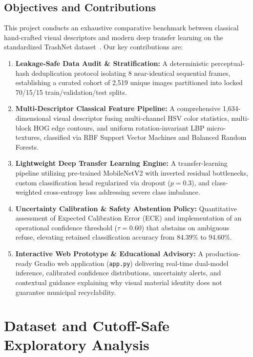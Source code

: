 \documentclass[11pt,a4paper]{article}
\begin{document}
\subsection{Objectives and Contributions}
This project conducts an exhaustive comparative benchmark between classical hand-crafted visual descriptors and modern deep transfer learning on the standardized TrashNet dataset~\cite{thung2016trashnet}. Our key contributions are:
\begin{enumerate}[label=\arabic*.]
    \item \textbf{Leakage-Safe Data Audit \& Stratification:} A deterministic perceptual-hash deduplication protocol isolating 8 near-identical sequential frames, establishing a curated cohort of 2,519 unique images partitioned into locked 70/15/15 train/validation/test splits.
    \item \textbf{Multi-Descriptor Classical Feature Pipeline:} A comprehensive 1,634-dimensional visual descriptor fusing multi-channel HSV color statistics, multi-block HOG edge contours, and uniform rotation-invariant LBP micro-textures, classified via RBF Support Vector Machines and Balanced Random Forests.
    \item \textbf{Lightweight Deep Transfer Learning Engine:} A transfer-learning pipeline utilizing pre-trained MobileNetV2 with inverted residual bottlenecks, custom classification head regularized via dropout ($p=0.3$), and class-weighted cross-entropy loss addressing severe class imbalance.
    \item \textbf{Uncertainty Calibration \& Safety Abstention Policy:} Quantitative assessment of Expected Calibration Error (ECE) and implementation of an operational confidence threshold ($\tau = 0.60$) that abstains on ambiguous refuse, elevating retained classification accuracy from 84.39\% to 94.60\%.
    \item \textbf{Interactive Web Prototype \& Educational Advisory:} A production-ready Gradio web application (\texttt{app.py}) delivering real-time dual-model inference, calibrated confidence distributions, uncertainty alerts, and contextual guidance explaining why visual material identity does not guarantee municipal recyclability.
\end{enumerate}

\newpage

\section{Dataset and Cutoff-Safe Exploratory Analysis}
\end{document}
